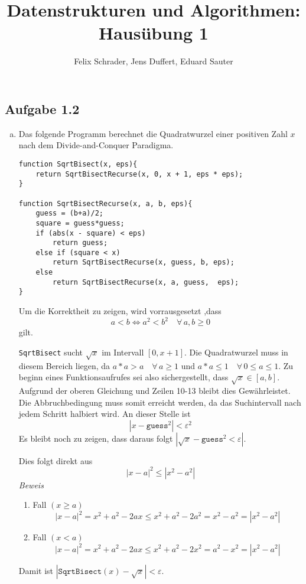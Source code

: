 \documentclass[11pt]{article}
\author{Felix Schrader, Jens Duffert, Eduard Sauter}
\title{Datenstrukturen und Algorithmen: Haus\"ubung 1}
\newcommand{\abs}[1]{\left| #1 \right| }
\begin{document}
\maketitle

\subsection*{Aufgabe 1.2}
\begin{enumerate}[a)]
  \item 
    Das folgende Programm berechnet die Quadratwurzel einer positiven 
    Zahl $x$ nach dem Divide-and-Conquer Paradigma. 


    \begin{lstlisting}
function SqrtBisect(x, eps){
    return SqrtBisectRecurse(x, 0, x + 1, eps * eps);
}

function SqrtBisectRecurse(x, a, b, eps){
    guess = (b+a)/2;
    square = guess*guess;
    if (abs(x - square) < eps)
        return guess;
    else if (square < x)
        return SqrtBisectRecurse(x, guess, b, eps);
    else
        return SqrtBisectRecurse(x, a, guess,  eps);
}
  \end{lstlisting}

  Um die Korrektheit zu zeigen, wird vorrausgesetzt ,dass  
  \begin{equation}
    a < b \iff a^2 < b^2 \quad\forall\, a, b \ge 0
  \end{equation}
  gilt.

  \texttt{SqrtBisect} sucht $\sqrt{x}$ im Intervall $[0,x+1]$. Die Quadratwurzel
  muss in diesem Bereich liegen, da $a * a > a \quad\forall\, a \ge 1 $ und
  $a * a \le 1 \quad\forall\, 0 \le a \le 1$.
  Zu beginn eines Funktionsaufrufes sei also sichergestellt, dass $\sqrt{x} \in
  [a,b]$.  Aufgrund der oberen Gleichung und Zeilen 10-13 bleibt dies
  Gew\"ahrleistet. Die Abbruchbedingung muss somit erreicht werden, da das
  Suchintervall nach jedem Schritt halbiert wird. An dieser Stelle ist
  \begin{equation}
  | x - \texttt{guess}^2 | < \varepsilon^2
  \end{equation}
  Es bleibt noch zu zeigen, dass daraus folgt $\left| \sqrt{x} - \texttt{guess}^2
  < \varepsilon \right|$.

  Dies folgt direkt aus \[ \left| x-a \right|^2 \le \left| x^2 - a^2 \right|  \]  
  \emph{Beweis} \\
  \begin{enumerate}
    \item Fall $(x \ge a)$
      \[ \abs{x-a}^2 = x^2 + a^2 - 2 ax \le x^2 + a^2 - 2 a^2 = x^2 -a^2 =
      \abs{x^2-a^2}  \] 
    \item Fall $(x < a)$
      \[ \abs{x-a}^2 = x^2 + a^2 - 2 ax \le x^2 + a^2 - 2 x^2 = a^2 -x^2 =
      \abs{x^2-a^2}  \] 
  \end{enumerate}
  Damit ist $\abs{ \texttt{SqrtBisect}(x)- \sqrt{x} } < \varepsilon$.




\end{enumerate}
\end{document}
